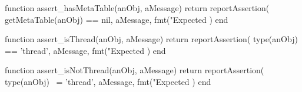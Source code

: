 \stopTestSuite

\startTestSuite[title=assert_doesNotHaveMetaTable]

\startLuaCode
function assert_hasMetaTable(anObj, aMessage)
  return reportAssertion(
    getMetaTable(anObj) == nil,
    aMessage,
    fmt("Expected %
  )
end
\stopLuaCode

\stopTestSuite

\startTestSuite[title=assert_isThread]

\startLuaCode
function assert_isThread(anObj, aMessage)
  return reportAssertion(
    type(anObj) == 'thread',
    aMessage,
    fmt("Expected %
  )
end
\stopLuaCode

\stopTestSuite

\startTestSuite[title=assert_isNotThread]

\startLuaCode
function assert_isNotThread(anObj, aMessage)
  return reportAssertion(
    type(anObj) ~= 'thread',
    aMessage,
    fmt("Expected %
  )
end
\stopLuaCode

\stopTestSuite

\stopchapter